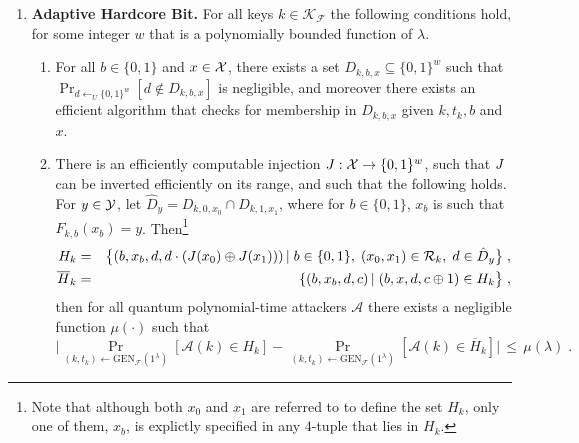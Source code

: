 \begin{definition}
\begin{enumerate}
\item{\textbf{Adaptive Hardcore Bit.}}
For all keys $k\in \mathcal{K}_{\mathcal{F}}$ the following conditions hold, for some integer $w$ that is a polynomially bounded function of $\lambda$. 
\begin{enumerate}
\item For all $b\in \{0,1\}$ and $x\in \mathcal{X}$, there exists a set $D_{k,b,x}\subseteq \{0,1\}^{w}$ such that $\Pr_{d\leftarrow_U \{0,1\}^w}[d\notin D_{k,b,x}]$ is negligible, and moreover there exists an efficient algorithm that checks for membership in $D_{k,b,x}$ given $k,t_k,b$ and $x$. 
\item There is an efficiently computable injection $J:\mathcal{X}\to \{0,1\}^w$, such that $J$ can be inverted efficiently on its range, and such that the following holds. For $y\in \mathcal{Y}$, let $\hat{D}_y = D_{k,0,x_0}\cap D_{k,1,x_1}$, where for $b\in\{0,1\}$, $x_b$ is such that $F_{k,b}(x_b)=y$. Then\footnote{Note that although both $x_0$ and $x_1$ are referred to to define the set $H_k$, only one of them, $x_b$, is explictly specified in any $4$-tuple that lies in $H_k$.}
\begin{eqnarray*}\label{eq:defsetsH}
H_k &=& \big\{(b,x_b,d,d\cdot(J(x_0)\oplus J(x_1)))\,|\; b\in \{0,1\},\; (x_0,x_1)\in \mathcal{R}_k,\; d\in \hat{D}_y\big\}\;,\\
\overline{H}_k &=& \{(b,x_b,d,c)\,|\; (b,x,d,c\oplus 1) \in H_k\big\}\;,
\end{eqnarray*}
then for all quantum polynomial-time attackers $\mathcal{A}$ there exists a negligible function $\mu(\cdot)$ such that 
\begin{equation}\label{eq:adaptive-hardcore}
\Big|\Pr_{(k,t_k)\leftarrow \textrm{GEN}_{\mathcal{F}}(1^{\lambda})}[\mathcal{A}(k) \in H_k] - \Pr_{(k,t_k)\leftarrow \textrm{GEN}_{\mathcal{F}}(1^{\lambda})}[\mathcal{A}(k) \in\overline{H}_k]\Big| \,\leq\, \mu(\lambda)\;.
\end{equation}
\end{enumerate}




\end{enumerate}
\end{definition}
